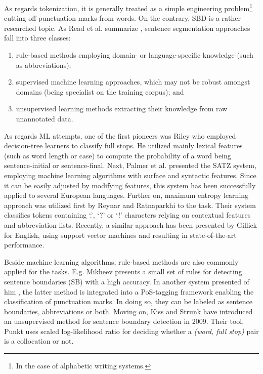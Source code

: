 As regards tokenization, it is generally treated as a simple engineering problem\footnote{In the case of alphabetic writing systems.} cutting off punctuation marks from words. 
On the contrary, SBD is a rather researched topic. 
As Read et al. summarize \cite{read2012sentence}, sentence segmentation approaches fall into three classes: 
\begin{enumerate}
 \item rule-based methods employing domain- or language-specific knowledge (such as abbreviations); 
 \item supervised machine learning approaches, which may not be robust amongst domains (being specialist on the training corpus); and
 \item unsupervised learning methods extracting their knowledge from raw unannotated data. 
\end{enumerate}

As regards ML attempts, one of the first pioneers was Riley \cite{riley1989some} who employed decision-tree learners to classify full stops. 
He utilized mainly lexical features (such as word length or case) to compute the probability of a word being sentence-initial or sentence-final. 
Next, Palmer et al. presented \cite{palmer1997adaptive} the SATZ system, employing machine learning algorithms with surface and syntactic features. 
Since it can be easily adjusted by modifying features, this system has been successfully applied to several European languages. 
Further on, maximum entropy learning approach was utilized first by Reynar and Ratnaparkhi \cite{reynar1997maximum} to the task. 
Their system classifies tokens containing `.', `?' or `!' characters relying on contextual features and abbreviation lists. 
Recently, a similar approach has been presented by Gillick \cite{gillick2009sentence} for English, using support vector machines and resulting in state-of-the-art performance.

Beside machine learning algorithms, rule-based methods are also commonly applied for the tasks. 
E.g. Mikheev presents \cite{mikheev2002periods} a small set of rules for detecting sentence boundaries (SB) with a high accuracy. 
In another system presented of him \cite{mikheev2000tagging}, the latter method is integrated into a PoS-tagging framework enabling the classification of punctuation marks. 
In doing so, they can be labeled as sentence boundaries, abbreviations or both. 
Moving on, Kiss and Strunk have introduced an unsupervised method for sentence boundary detection in 2009. 
Their tool, Punkt \cite{kiss2006unsupervised} uses scaled log-likelihood ratio for deciding whether a \emph{(word, full stop)} pair is a collocation or not.

